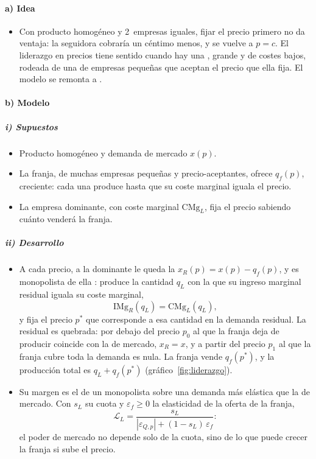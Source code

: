 \documentclass[11pt]{article}
\begin{document}
\paragraph{a) Idea}

\begin{itemize}
\item Con producto homogéneo y 2~empresas iguales, fijar el precio primero no da ventaja: la seguidora cobraría un céntimo menos, y se vuelve a $p=c$. El liderazgo en precios tiene sentido cuando hay una , grande y de costes bajos, rodeada de una  de empresas pequeñas que aceptan el precio que ella fija. El modelo se remonta a \textcite{Forchheimer1908Theoretisches}.
\end{itemize}

\paragraph{b) Modelo}

\subparagraph{i) Supuestos}

\begin{itemize}
\item Producto homogéneo y demanda de mercado $x(p)$.
\item La franja, de muchas empresas pequeñas y precio-aceptantes, ofrece $q_f(p)$, creciente: cada una produce hasta que su coste marginal iguala el precio.
\item La empresa dominante, con coste marginal $\mathrm{CMg}_L$, fija el precio sabiendo cuánto venderá la franja.
\end{itemize}

\subparagraph{ii) Desarrollo}

\begin{itemize}
\item A cada precio, a la dominante le queda la  $x_R(p)=x(p)-q_f(p)$, y es monopolista de ella : produce la cantidad $q_L$ con la que su ingreso marginal residual iguala su coste marginal,
  \[
  \mathrm{IMg}_R(q_L)=\mathrm{CMg}_L(q_L),
  \]
  y fija el precio $p^*$ que corresponde a esa cantidad en la demanda residual. La residual es quebrada: por debajo del precio $p_0$ al que la franja deja de producir coincide con la de mercado, $x_R=x$, y a partir del precio $p_1$ al que la franja cubre toda la demanda es nula. La franja vende $q_f(p^*)$, y la producción total es $q_L+q_f(p^*)$ (gráfico~\ref{fig:liderazgo}).
\item Su margen es el de un monopolista sobre una demanda más elástica que la de mercado. Con $s_L$ su cuota y $\varepsilon_f\geq0$ la elasticidad de la oferta de la franja\nocite{LandesPosner1981Market},
  \[
  \mathcal{L}_L=\frac{s_L}{|\varepsilon_{Q,p}|+(1-s_L)\,\varepsilon_f}:
  \]
  el poder de mercado no depende solo de la cuota, sino de lo que puede crecer la franja si sube el precio.
\end{itemize}
\end{document}
